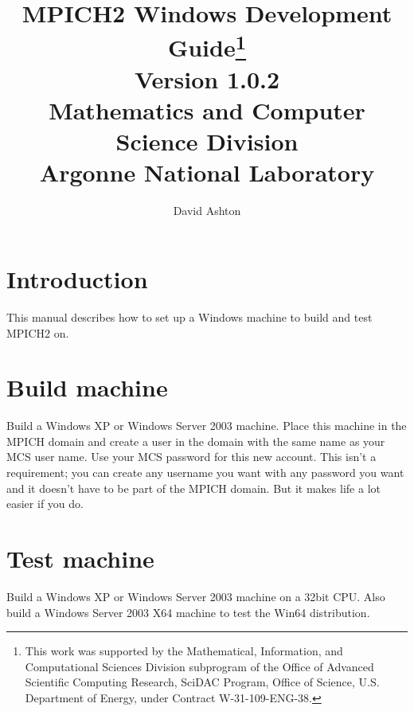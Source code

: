 \documentclass[dvipdfm,11pt]{article}
\begin{document}
\title{{\bf MPICH2 Windows Development Guide}\thanks{This work was supported by the
    Mathematical, Information, and Computational Sciences Division
    subprogram of the Office of Advanced Scientific Computing Research,
    SciDAC Program, Office of Science, U.S. Department of Energy, under
    Contract
    W-31-109-ENG-38.}\\
  Version 1.0.2\\
  Mathematics and Computer Science Division\\
  Argonne National Laboratory}

\author{David Ashton}

\maketitle
\cleardoublepage

\tableofcontents
\clearpage

\pagestyle{headings}

\section{Introduction}
\label{sec:intro}
This manual describes how to set up a Windows machine to build and test MPICH2 on.

\section{Build machine}
\label{sec:machine}

Build a Windows XP or Windows Server 2003 machine.  Place this machine in the MPICH domain
and create a user in the domain with the same name as your MCS user name.  Use your MCS 
password for this new account.  This isn't a requirement; you can create any username you
want with any password you want and it doesn't have to be part of the MPICH domain.
But it makes life a lot easier if you do.

\section{Test machine}
\label{sec:test_machine}

Build a Windows XP or Windows Server 2003 machine on a 32bit CPU.
Also build a Windows Server 2003 X64 machine to test the Win64 distribution.

\end{document}
